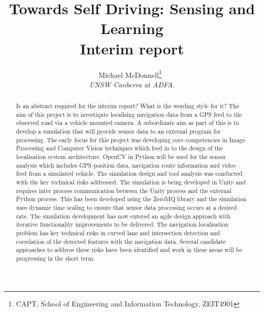 \documentclass[]{aiaa-tc}%
\title{Towards Self Driving: Sensing and Learning\\ Interim report}
\author{
  Michael McDonnell\thanks{CAPT, School of Engineering and Information Technology, ZEIT4901}\
  \\
  {\normalsize\itshape
   UNSW Canberra at ADFA.}\\
  }
\begin{document}
\maketitle


\begin{abstract}
Is an abstract required for the interim report? What is the wording style for it?
The aim of this project is to investigate localising navigation data from a GPS feed to the observed road via a vehicle mounted camera. A subordinate aim as part of this is to develop a simulation that will provide sensor data to an external program for processing. 
The early focus for this project was developing core competencies in Image Processing and Computer Vision techniques which feed in to the design of the localisation system architecture. OpenCV in Python will be used for the sensor analysis which includes GPS position data, navigation route information and video feed from a simulated vehicle.
The simulation design and tool analysis was conducted with the key technical risks addressed. The simulation is being developed in Unity and requires inter process communication between the Unity process and the external Python process. This has been developed using the ZeroMQ library and the simulation uses dynamic time scaling to ensure that sensor data processing occurs at a desired rate. The simulation development has now entered an agile design approach with iterative functionality improvements to be delivered.
The navigation localisation problem has key technical risks in curved lane and intersection detection and correlation of the detected features with the navigation data. Several candidate approaches to address these risks have been identified and work in these areas will be progressing in the short term.
\end{abstract}

\newpage
\tableofcontents


%
\end{document}
